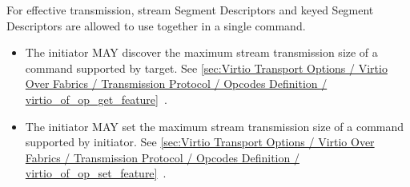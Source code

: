 For effective transmission, stream Segment Descriptors and keyed Segment
Descriptors are allowed to use together in a single command.

\begin{itemize}
\item The initiator MAY discover the maximum stream transmission size of a
command supported by target. See \ref{sec:Virtio Transport Options / Virtio Over Fabrics / Transmission Protocol / Opcodes Definition / virtio_of_op_get_feature}~.
\item The initiator MAY set the maximum stream transmission size of a command
supported by initiator. See \ref{sec:Virtio Transport Options / Virtio Over Fabrics / Transmission Protocol / Opcodes Definition / virtio_of_op_set_feature}~.
\end{itemize}

